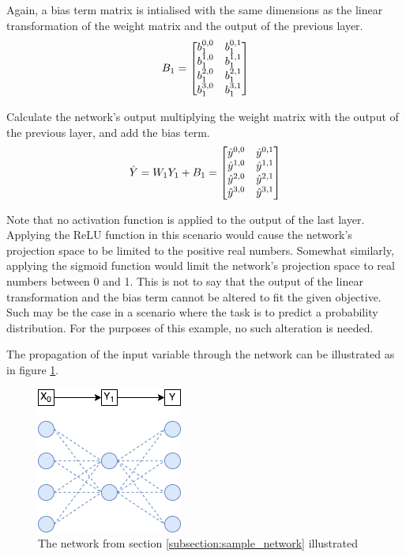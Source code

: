 Again, a bias term matrix is intialised with the same dimensions as the linear transformation of the weight matrix and the output of the previous layer.
\[
B_1 = 
\begin{bmatrix}
    b_1^{0,\space 0} & b_1^{0,\space 1} \\
    b_1^{1,\space 0} & b_1^{1,\space 1} \\
    b_1^{2,\space 0} & b_1^{2,\space 1} \\
    b_1^{3,\space 0} & b_1^{3,\space 1}
\end{bmatrix}
\]


Calculate the network's output multiplying the weight matrix with the output of the previous layer, and add the bias term.
\[
\hat{Y} = W_1 Y_1 + B_1 =
\begin{bmatrix}
    \hat{y}^{0,\space 0} & \hat{y}^{0,\space 1} \\
    \hat{y}^{1,\space 0} & \hat{y}^{1,\space 1} \\
    \hat{y}^{2,\space 0} & \hat{y}^{2,\space 1} \\
    \hat{y}^{3,\space 0} & \hat{y}^{3,\space 1}
\end{bmatrix}
\]

Note that no activation function is applied to the output of the last layer. 
Applying the ReLU function in this scenario would cause the network's projection space to be limited to the positive real numbers.
Somewhat similarly, applying the sigmoid function would limit the network's projection space to real numbers between 0 and 1. 
This is not to say that the output of the linear transformation and the bias term cannot be altered to fit the given objective.
Such may be the case in a scenario where the task is to predict a probability distribution. For the purposes of this example, no such alteration is needed.

The propagation of the input variable through the network can be illustrated as in figure \ref{fig:sample_network}.


\begin{figure}
    \centering
    \includegraphics{figures/background/sample_network.png}
    \caption{The network from section \ref{subsection:sample_network} illustrated}%
    \label{fig:sample_network}%
\end{figure}




